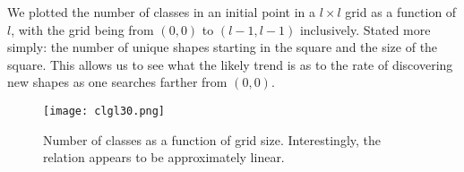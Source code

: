 \documentclass{article}
\begin{document}
We plotted the number of classes in an initial point in a $l \times l$ grid as a function of $l$, with the grid being from $(0,0)$ to $(l-1,l-1)$ inclusively. Stated more simply: the number of unique shapes starting in the square and the size of the square. This allows us to see what the likely trend is as to the rate of discovering new shapes as one searches farther from $(0,0)$.

\begin{figure}[h!]
\centering
\texttt{[image: clgl30.png]}
\caption{Number of classes as a function of grid size. Interestingly, the relation appears to be approximately linear.}
\end{figure}
\end{document}
